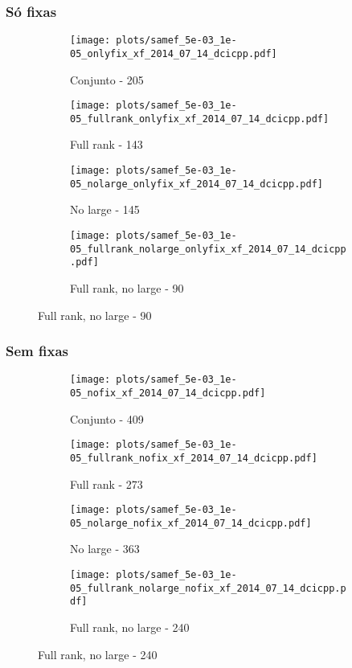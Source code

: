 \documentclass{article}
\begin{document}
\subsubsection{Só fixas}
\begin{figure}[H]
  \centering
  \begin{subfigure}{0.48\textwidth}
    \texttt{[image: plots/samef\_5e-03\_1e-05\_onlyfix\_xf\_2014\_07\_14\_dcicpp.pdf]}
    \caption{Conjunto - 205}
  \end{subfigure}
  \begin{subfigure}{0.48\textwidth}
    \texttt{[image: plots/samef\_5e-03\_1e-05\_fullrank\_onlyfix\_xf\_2014\_07\_14\_dcicpp.pdf]}
    \caption{Full rank - 143}
  \end{subfigure}
  \begin{subfigure}{0.48\textwidth}
    \texttt{[image: plots/samef\_5e-03\_1e-05\_nolarge\_onlyfix\_xf\_2014\_07\_14\_dcicpp.pdf]}
    \caption{No large - 145}
  \end{subfigure}
  \begin{subfigure}{0.48\textwidth}
    \texttt{[image: plots/samef\_5e-03\_1e-05\_fullrank\_nolarge\_onlyfix\_xf\_2014\_07\_14\_dcicpp.pdf]}
    \caption{Full rank, no large - 90}
  \end{subfigure}
\end{figure}

\subsubsection{Sem fixas}
\begin{figure}[H]
  \centering
  \begin{subfigure}{0.48\textwidth}
    \texttt{[image: plots/samef\_5e-03\_1e-05\_nofix\_xf\_2014\_07\_14\_dcicpp.pdf]}
    \caption{Conjunto - 409}
  \end{subfigure}
  \begin{subfigure}{0.48\textwidth}
    \texttt{[image: plots/samef\_5e-03\_1e-05\_fullrank\_nofix\_xf\_2014\_07\_14\_dcicpp.pdf]}
    \caption{Full rank - 273}
  \end{subfigure}
  \begin{subfigure}{0.48\textwidth}
    \texttt{[image: plots/samef\_5e-03\_1e-05\_nolarge\_nofix\_xf\_2014\_07\_14\_dcicpp.pdf]}
    \caption{No large - 363}
  \end{subfigure}
  \begin{subfigure}{0.48\textwidth}
    \texttt{[image: plots/samef\_5e-03\_1e-05\_fullrank\_nolarge\_nofix\_xf\_2014\_07\_14\_dcicpp.pdf]}
    \caption{Full rank, no large - 240}
  \end{subfigure}
\end{figure}



\end{document}
